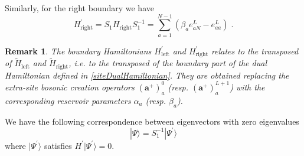 \documentclass[10pt]{article}
\numberwithin{equation}{section}
\numberwithin{equation}{subsection}
\newtheorem{remark}{Remark}
\newcommand{\dt}{\;.}
\begin{document}
Similarly, for the right boundary we have 
\begin{equation}
H_{\text{right}}^{'}=S_{1}H_{\text{right}}S_{1}^{-1}=
\sum_{a=1}^{N-1}\left(\beta_{a}e_{aN}^{L}-e_{aa}^{L}\right)\dt
\end{equation}
\begin{remark}
	The boundary Hamiltonians $H_{\text{left}}^{'}$ and $H_{\text{right}}^{'}$ relates to the transposed of  $\widetilde{H}_{\text{left}}$ and $\widetilde{H}_{\text{right}}$, i.e. to the transposed of the boundary part of the dual Hamiltonian  defined in \eqref{siteDualHamiltonian}. They are obtained replacing the  extra-site bosonic creation operators $(\mathbf{a}^{+})_{a}^{0}$  (resp. $(\mathbf{a}^{+})_{a}^{L+1}$) with the corresponding reservoir parameters $\alpha_a$ (resp. $\beta_a$).
\end{remark}
We have the following correspondence between eigenvectors with zero eigenvalues
\begin{equation}\label{S1-Inverse}
	|\Psi\rangle =S_{1}^{-1}|\Psi^{'}\rangle
\end{equation}
where $|\Psi^{'}\rangle$ satisfies $H^{'}|\Psi^{'}\rangle=0$.
\end{document}
